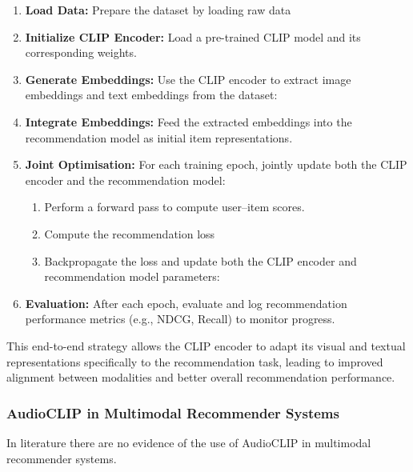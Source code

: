 \begin{enumerate}
    \item \textbf{Load Data:} Prepare the dataset by loading raw data
    
    \item \textbf{Initialize CLIP Encoder:} Load a pre-trained CLIP model and its corresponding weights.
    
    \item \textbf{Generate Embeddings:} Use the CLIP encoder to extract image embeddings and text embeddings from the dataset:
    
    \item \textbf{Integrate Embeddings:} Feed the extracted embeddings into the recommendation model as initial item representations.
    
    \item \textbf{Joint Optimisation:} For each training epoch, jointly update both the CLIP encoder and the recommendation model:
    \begin{enumerate}
        \item Perform a forward pass to compute user--item scores.
        \item Compute the recommendation loss 
        \item Backpropagate the loss and update both the CLIP encoder and recommendation model parameters:
    \end{enumerate}
    \item \textbf{Evaluation:} After each epoch, evaluate and log recommendation performance metrics (e.g., NDCG, Recall) to monitor progress.
\end{enumerate}

This end-to-end strategy allows the CLIP encoder to adapt its visual and textual representations specifically to the recommendation task, leading to improved alignment between modalities and better overall recommendation performance.
\subsubsection{AudioCLIP in Multimodal Recommender Systems}
In literature there are no evidence of the use of AudioCLIP in multimodal recommender systems. 